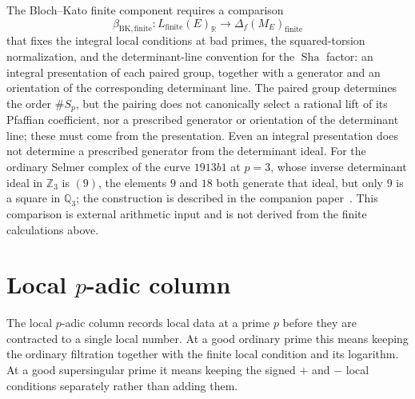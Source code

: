 \documentclass[11pt]{article}
\theoremstyle{definition}
\newcommand{\Q}{\mathbb{Q}}
\newcommand{\R}{\mathbb{R}}
\newcommand{\Z}{\mathbb{Z}}
\newcommand{\Sha}{\operatorname{Sha}}
\begin{document}
\begin{obligation}\label{obl:apparatus:rho-finite-transport}
The Bloch--Kato finite component requires a comparison
\[
  \beta_{\mathrm{BK,finite}}:
  L_{\mathrm{finite}}(E)_{\R}
  \longrightarrow
  \Delta_f(M_E)_{\mathrm{finite}}
\]
that fixes the integral local conditions at bad primes, the
squared-torsion normalization, and the determinant-line convention for
the $\Sha$ factor: an integral presentation of each paired group,
together with a generator and an orientation of the corresponding
determinant line.  The paired group determines the order $\#S_p$, but the
pairing does not canonically select a rational lift of its Pfaffian
coefficient, nor a prescribed generator or orientation of the determinant
line; these must come from the presentation.  Even an integral
presentation does not determine a prescribed generator from the
determinant ideal.  For the ordinary Selmer complex of the curve $1913b1$
at $p=3$, whose inverse determinant ideal in $\Z_3$ is $(9)$, the
elements $9$ and $18$ both generate that ideal, but only $9$ is a square
in $\Q_3$; the construction is described in the companion
paper~\citep{TsiokosBSDClosure2026}.  This comparison is external
arithmetic input and is not derived from the finite calculations above.
\end{obligation}
 \section{Local \texorpdfstring{$p$}{p}-adic column}
\label{sec:p-adic}

The local $p$-adic column records local data at a prime $p$ before they
are contracted to a single local number.  At a good ordinary prime this
means keeping the ordinary filtration together with the finite local
condition and its logarithm.  At a good supersingular prime it means
keeping the signed $+$ and $-$ local conditions separately rather than
adding them.
\end{document}
